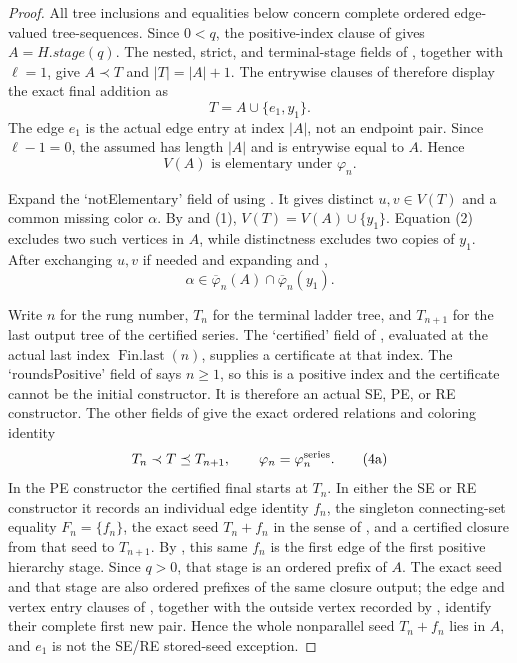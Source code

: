 \begin{proof}
All tree inclusions and equalities below concern complete ordered
edge-valued tree-sequences.  Since $0<q$, the positive-index clause of
 gives $A=H.\mathit{stage}(q)$.
The nested, strict, and terminal-stage fields of
, together with $\ell=1$, give
$A\prec T$ and $|T|=|A|+1$.  The entrywise clauses of
 therefore display the exact final
addition as
\[
                         T=A\cup\{e_1,y_1\}.                  \tag{1}
\]
The edge $e_1$ is the actual edge entry at index $|A|$, not an endpoint
pair.  Since $\ell-1=0$, the assumed
 has length $|A|$ and is entrywise equal to
$A$.  Hence
\[
              V(A)\text{ is elementary under }\varphi_n.     \tag{2}
\]

Expand the `notElementary' field of
 using
.  It gives distinct
$u,v\in V(T)$ and a common missing color $\alpha$.  By
 and (1),
$V(T)=V(A)\cup\{y_1\}$.  Equation (2) excludes two such vertices in
$A$, while distinctness excludes two copies of $y_1$.  After exchanging
$u,v$ if needed and expanding  and
,
\[
 \alpha\in\overline\varphi_n(A)
       \cap\overline\varphi_n(y_1).                           \tag{3}
\]

Write $n$ for the rung number, $T_n$ for the terminal ladder tree, and
$T_{n+1}$ for the last output tree of the certified series.  The
`certified' field of , evaluated at the actual
last index $\operatorname{Fin.last}(n)$, supplies a
 certificate at that index.  The
`roundsPositive' field of  says $n\geq1$,
so this is a positive index and the certificate cannot be the initial
constructor.  It is therefore an actual SE, PE, or RE constructor.  The
other fields of  give the exact ordered
relations and coloring identity
\[
                 T_n\prec T\preceq T_{n+1},
        \qquad \varphi_n=\varphi^{\rm series}_n.              \tag{4a}
\]
In the PE constructor the certified final
 starts at $T_n$.  In either the SE or RE
constructor it records an individual edge identity $f_n$, the singleton
connecting-set equality $F_n=\{f_n\}$, the exact seed $T_n+f_n$ in the
sense of , and a certified closure from
that seed to $T_{n+1}$.  By
, this same $f_n$ is the first
edge of the first positive hierarchy stage.  Since $q>0$, that stage is
an ordered prefix of $A$.  The exact seed and that stage are also ordered
prefixes of the same closure output; the edge and vertex entry clauses of
, together with the outside vertex
recorded by , identify their complete
first new pair.  Hence the whole nonparallel seed $T_n+f_n$ lies in $A$,
and $e_1$ is not the SE/RE stored-seed exception.


\end{proof}
